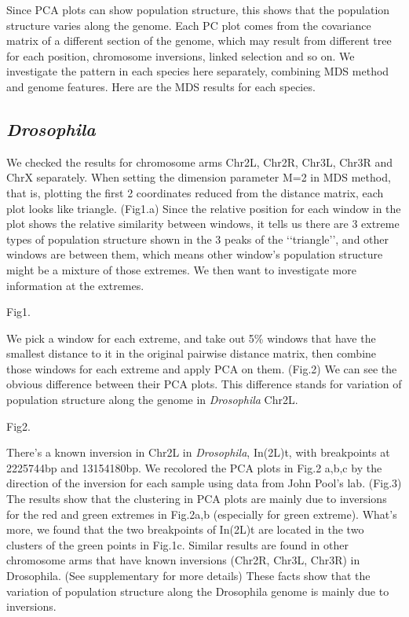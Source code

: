 \documentclass[11pt, oneside]{article}   	%
\begin{document}
\noindent Since PCA plots can show population structure, this shows that the population structure varies along the genome. Each PC plot comes from the covariance matrix of a different section of the genome, which may result from different tree for each position, chromosome inversions, linked selection and so on. We investigate the pattern in each species here separately, combining MDS method and genome features.
Here are the MDS results for each species.
\subsection{\textit{Drosophila}}
We checked the results for chromosome arms Chr2L, Chr2R, Chr3L, Chr3R and ChrX separately. When setting the dimension parameter M=2 in MDS method, that is, plotting the first 2 coordinates reduced from the distance matrix, each plot looks like triangle.
(Fig1.a) Since the relative position for each window in the plot shows the relative similarity between windows, it tells us there are 3 extreme types of population structure shown in the 3 peaks of the \lq\lq triangle\rq\rq, and other windows are between them, which means other window's population structure might be a mixture of those extremes. We then want to investigate more information at the extremes.

Fig1.

\noindent We pick a window for each extreme, and take out 5\% windows that have the smallest distance to it in the original pairwise distance matrix, then combine those windows for each extreme and apply PCA on them. (Fig.2) We can see the obvious difference between their PCA plots. This difference stands for variation of population structure along the genome in \textit{Drosophila} Chr2L.

Fig2.

\noindent There's a known inversion in Chr2L in \textit{Drosophila}, In(2L)t, with breakpoints at 2225744bp and 13154180bp. \cite{key11} We recolored the PCA plots in Fig.2 a,b,c by the direction of the inversion for each sample using data from John Pool's lab. (Fig.3) The results show that the clustering in PCA plots are mainly due to inversions for the red and green extremes in Fig.2a,b (especially for green extreme). What's more, we found that the two breakpoints of In(2L)t are located in the two clusters of the green points in Fig.1c. Similar results are found in other chromosome arms that have known inversions (Chr2R,
Chr3L, Chr3R) in Drosophila. (See supplementary for more details) These facts show that the variation of population structure along the Drosophila genome is mainly due to inversions.
\end{document}
